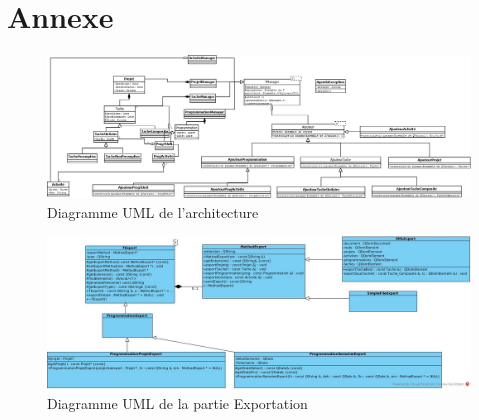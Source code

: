 \section{Annexe}

\begin{figure}
   \includegraphics[scale=0.2]{ressources/UML.PNG}
   \caption{\label{Annexe 1} Diagramme UML de l'architecture}
\end{figure}

\begin{figure}
	\includegraphics[scale=0.4]{ressources/ExportClasses.jpg}
	\caption{\label{Annexe2} Diagramme UML de la partie Exportation}
\end{figure}